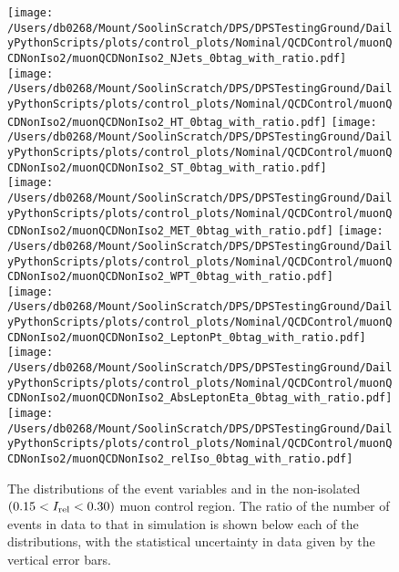 \begin{figure}[hp]
	\centering
	\texttt{[image: /Users/db0268/Mount/SoolinScratch/DPS/DPSTestingGround/DailyPythonScripts/plots/control\_plots/Nominal/QCDControl/muonQCDNonIso2/muonQCDNonIso2\_NJets\_0btag\_with\_ratio.pdf]}
	\texttt{[image: /Users/db0268/Mount/SoolinScratch/DPS/DPSTestingGround/DailyPythonScripts/plots/control\_plots/Nominal/QCDControl/muonQCDNonIso2/muonQCDNonIso2\_HT\_0btag\_with\_ratio.pdf]}
	\texttt{[image: /Users/db0268/Mount/SoolinScratch/DPS/DPSTestingGround/DailyPythonScripts/plots/control\_plots/Nominal/QCDControl/muonQCDNonIso2/muonQCDNonIso2\_ST\_0btag\_with\_ratio.pdf]} \\
	\texttt{[image: /Users/db0268/Mount/SoolinScratch/DPS/DPSTestingGround/DailyPythonScripts/plots/control\_plots/Nominal/QCDControl/muonQCDNonIso2/muonQCDNonIso2\_MET\_0btag\_with\_ratio.pdf]}
	\texttt{[image: /Users/db0268/Mount/SoolinScratch/DPS/DPSTestingGround/DailyPythonScripts/plots/control\_plots/Nominal/QCDControl/muonQCDNonIso2/muonQCDNonIso2\_WPT\_0btag\_with\_ratio.pdf]} \\
	\texttt{[image: /Users/db0268/Mount/SoolinScratch/DPS/DPSTestingGround/DailyPythonScripts/plots/control\_plots/Nominal/QCDControl/muonQCDNonIso2/muonQCDNonIso2\_LeptonPt\_0btag\_with\_ratio.pdf]} 
	\texttt{[image: /Users/db0268/Mount/SoolinScratch/DPS/DPSTestingGround/DailyPythonScripts/plots/control\_plots/Nominal/QCDControl/muonQCDNonIso2/muonQCDNonIso2\_AbsLeptonEta\_0btag\_with\_ratio.pdf]}
	\texttt{[image: /Users/db0268/Mount/SoolinScratch/DPS/DPSTestingGround/DailyPythonScripts/plots/control\_plots/Nominal/QCDControl/muonQCDNonIso2/muonQCDNonIso2\_relIso\_0btag\_with\_ratio.pdf]}
	\caption[The distributions of the event variables and \Irel{} in the non-isolated $(0.15 < \Irel < 0.30)$ muon control region. The ratio of the number of events in data to that in simulation is shown below each of the distributions, with the statistical uncertainty in data given by the vertical error bars.]{The distributions of the event variables and \Irel{} in the non-isolated $(0.15 < \Irel < 0.30)$ muon control region. The ratio of the number of events in data to that in simulation is shown below each of the distributions, with the statistical uncertainty in data given by the vertical error bars.}
	\label{fig:QCDmuNonIso2}
\end{figure}
